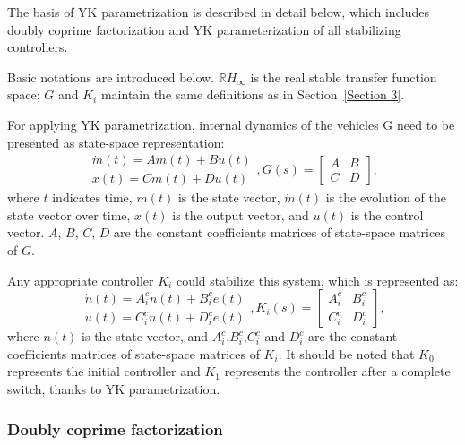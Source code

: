 \documentclass[journal]{IEEEtran}
\begin{document}
The basis of YK parametrization is described in detail below, which includes doubly coprime factorization and YK parameterization of all stabilizing controllers.

Basic notations are introduced below. $\mathbb{R} H_{\infty}$ is the real stable transfer function space; $G$ and $K_i$ maintain the same definitions as in Section~\ref{Section 3}.

For applying YK parametrization, internal dynamics of the vehicles G need to be presented as state-space representation:
\begin{equation}
  \begin{gathered}
    \dot{m}(t)=A m(t)+B u(t) \\
    x(t)=C m(t)+D u(t)
  \end{gathered}, G(s)=\left[\begin{array}{ll}
      A & B \\
      C & D
    \end{array}\right],
\end{equation}
where $t$ indicates time, $m(t)$ is the state vector, $\dot{m}(t)$ is the evolution of the state vector over time, $x(t)$ is the output vector, and $u(t)$ is the control vector. $A$, $B$, $C$, $D$ are the constant coefficients matrices of state-space matrices of $G$.

Any appropriate controller $K_i$ could stabilize this system, which is represented as:
\begin{equation}
  \begin{gathered}
    \dot{n}(t)=A_{i}^{c} n(t)+B_{i}^{c} e(t) \\
    u(t)=C_{i}^{c} n(t)+D_{i}^{c} e(t)
  \end{gathered}, K_{i}(s)=\left[\begin{array}{ll}
      A_{i}^{c} & B_{i}^{c} \\
      C_{i}^{c} & D_{i}^{c}
    \end{array}\right],
\end{equation}
where $n(t)$ is the state vector, and $A_i^c$,$B_i^c$,$C_i^c$ and $D_i^c$ are the constant coefficients matrices of state-space matrices of $K_i$. It should be noted that $K_0$ represents the initial controller and $K_1$ represents the controller after a complete switch, thanks to YK parametrization.

\subsubsection{Doubly coprime factorization}
\label{Section 3.2.2}
\end{document}
